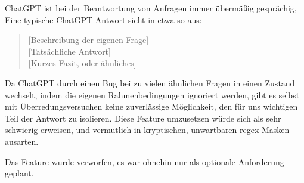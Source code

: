 \documentclass[stu, a4paper, 11pt, floatsintext]{apa7}
\begin{document}
\noindent ChatGPT ist bei der Beantwortung von Anfragen immer übermäßig gesprächig,
Eine typische ChatGPT-Antwort sieht in etwa so aus:

\begin{quote}
[Beschreibung der eigenen Frage] \\[0pt]
[Tatsächliche Antwort] \\[0pt]
[Kurzes Fazit, oder ähnliches] \\[0pt]
\end{quote}

\noindent Da ChatGPT durch einen Bug bei zu vielen ähnlichen Fragen in einen Zustand wechselt, indem die eigenen Rahmenbedingungen ignoriert werden, gibt es selbst mit Überredungsversuchen keine zuverlässige Möglichkeit, den für uns wichtigen Teil der Antwort zu isolieren.
Diese Feature umzusetzen würde sich als sehr schwierig erweisen, und vermutlich in kryptischen, unwartbaren regex Masken ausarten.

Das Feature wurde verworfen, es war ohnehin nur als optionale Anforderung geplant.
\end{document}

